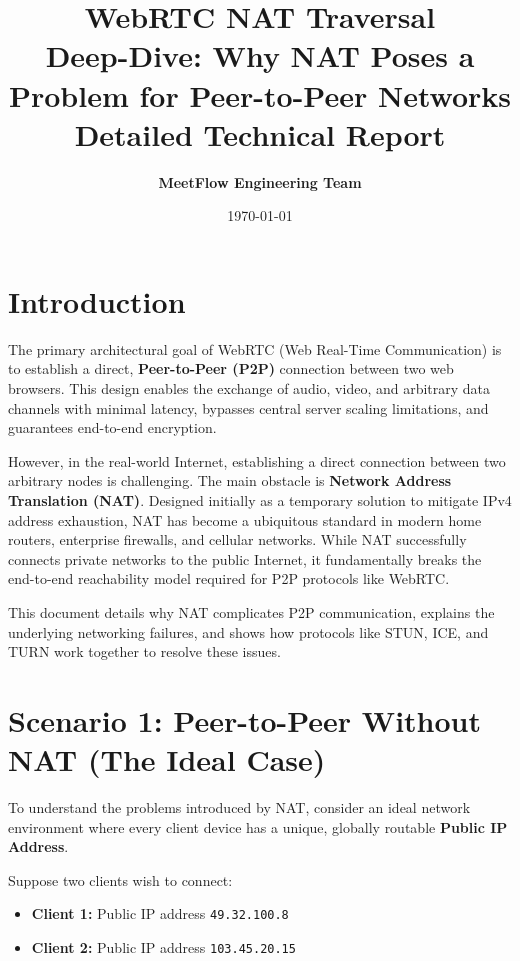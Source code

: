 \documentclass[11pt,a4paper]{article}
\title{
    \vspace{1.5in}
    \Huge \textbf{WebRTC NAT Traversal} \\
    \Large Deep-Dive: Why NAT Poses a Problem for Peer-to-Peer Networks \\
    \vspace{0.5in}
    \huge \textbf{Detailed Technical Report}
    \vspace{1.5in}
}
\author{
    \textbf{MeetFlow Engineering Team}
}
\date{\today}
\begin{document}
\maketitle
\thispagestyle{empty}
\newpage

\tableofcontents
\newpage

\section{Introduction}

The primary architectural goal of WebRTC (Web Real-Time Communication) is to establish a direct, \textbf{Peer-to-Peer (P2P)} connection between two web browsers. This design enables the exchange of audio, video, and arbitrary data channels with minimal latency, bypasses central server scaling limitations, and guarantees end-to-end encryption.

However, in the real-world Internet, establishing a direct connection between two arbitrary nodes is challenging. The main obstacle is \textbf{Network Address Translation (NAT)}. Designed initially as a temporary solution to mitigate IPv4 address exhaustion, NAT has become a ubiquitous standard in modern home routers, enterprise firewalls, and cellular networks. While NAT successfully connects private networks to the public Internet, it fundamentally breaks the end-to-end reachability model required for P2P protocols like WebRTC.

This document details why NAT complicates P2P communication, explains the underlying networking failures, and shows how protocols like STUN, ICE, and TURN work together to resolve these issues.

\section{Scenario 1: Peer-to-Peer Without NAT (The Ideal Case)}

To understand the problems introduced by NAT, consider an ideal network environment where every client device has a unique, globally routable \textbf{Public IP Address}. 

Suppose two clients wish to connect:
\begin{itemize}
    \item \textbf{Client 1:} Public IP address \texttt{49.32.100.8}
    \item \textbf{Client 2:} Public IP address \texttt{103.45.20.15}
\end{itemize}
\end{document}
